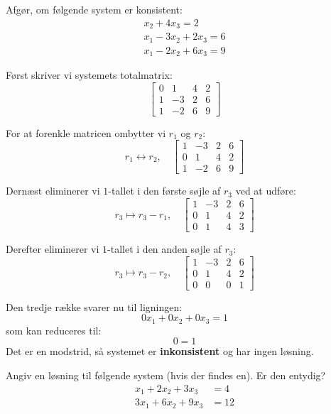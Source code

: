 \begin{example}
    \label{ex:inconsistent-system}
Afgør, om følgende system er konsistent:
        \[
            \begin{array}{r}
            x_2+4 x_3=2 \\
            x_1-3 x_2+2 x_3=6 \\
            x_1-2 x_2+6 x_3=9
            \end{array}
        \]
\end{example}

\begin{solution}
    Først skriver vi systemets totalmatrix:
    \[
    \left[\begin{array}{cccc}
    0 & 1 & 4 & 2 \\
    1 & -3 & 2 & 6 \\
    1 & -2 & 6 & 9
    \end{array}\right]
    \]
    
    For at forenkle matricen ombytter vi $r_1$ og $r_2$:
    \[
    r_1 \leftrightarrow r_2, \quad \left[\begin{array}{cccc}
    1 & -3 & 2 & 6 \\
    0 & 1 & 4 & 2 \\
    1 & -2 & 6 & 9
    \end{array}\right]
    \]
    
    Dernæst eliminerer vi $1$-tallet i den første søjle af $r_3$ ved at udføre:
    \[
    r_3 \mapsto r_3 - r_1, \quad \left[\begin{array}{cccc}
    1 & -3 & 2 & 6 \\
    0 & 1 & 4 & 2 \\
    0 & 1 & 4 & 3
    \end{array}\right]
    \]
    
    Derefter eliminerer vi $1$-tallet i den anden søjle af $r_3$:
    \[
    r_3 \mapsto r_3 - r_2, \quad \left[\begin{array}{cccc}
    1 & -3 & 2 & 6 \\
    0 & 1 & 4 & 2 \\
    0 & 0 & 0 & 1
    \end{array}\right]
    \]
    
    Den tredje række svarer nu til ligningen:
    \[
    0x_1 + 0x_2 + 0x_3 = 1
    \]
    som kan reduceres til:
    \[
    0 = 1
    \]
    Det er en modstrid, så systemet er \textbf{inkonsistent} og har ingen løsning. \end{solution}

\begin{example}
    Angiv en løsning til følgende system (hvis der findes en). Er den entydig?
    \[
        \begin{aligned}
        x_1+2 x_2+3 x_3 & =4 \\
        3 x_1+6 x_2+9 x_3 & =12
        \end{aligned}
    \]
\end{example}

